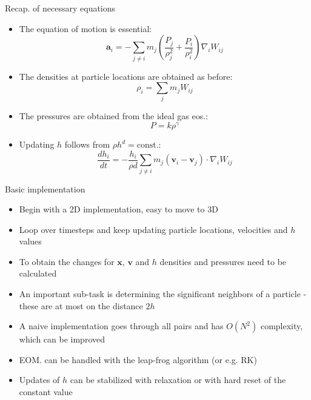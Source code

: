 \documentclass{beamer}
\begin{document}
\begin{frame}{Recap. of necessary equations}
\begin{itemize}

\item The equation of motion is essential:
\begin{equation}
 \mathbf{a}_i = -\sum_{j \neq i} m_j \left( \frac{P_j}{\rho_j^2} + \frac{P_i}{\rho_i^2} \right) \nabla_i W_{ij} 
\end{equation}
\item The densities at particle locations are obtained as before:
\begin{equation}
\rho_i = \sum_j m_j W_{ij}
\end{equation}
\item The pressures are obtained from the ideal gas eos.:
\begin{equation}
 P = k \rho^\gamma
\end{equation}
\item Updating $h$ follows from $\rho h^d = \text{const.}$:
\begin{equation}
 \frac{d h_i}{dt} = -\frac{h_i}{\rho d} \sum_{j \neq i} m_j ( \mathbf{v}_i - \mathbf{v}_j ) \cdot \nabla_i W_{ij}
\end{equation}

\end{itemize}
\end{frame}

\begin{frame}{Basic implementation}
\begin{itemize}

\item Begin with a 2D implementation, easy to move to 3D
\item Loop over timesteps and keep updating particle locations, velocities and $h$ values
\item To obtain the changes for $\mathbf{x}$, $\mathbf{v}$ and $h$ densities and pressures need to be calculated
\item An important sub-task is determining the significant neighbors of a particle - these are at most on the distance $2h$
\item A naive implementation goes through all pairs and has $O(N^2)$ complexity, which can be improved
\item EOM. can be handled with the leap-frog algorithm (or e.g. RK)
\item Updates of $h$ can be stabilized with relaxation or with hard reset of the constant value

\end{itemize}
\end{frame}
\end{document}
